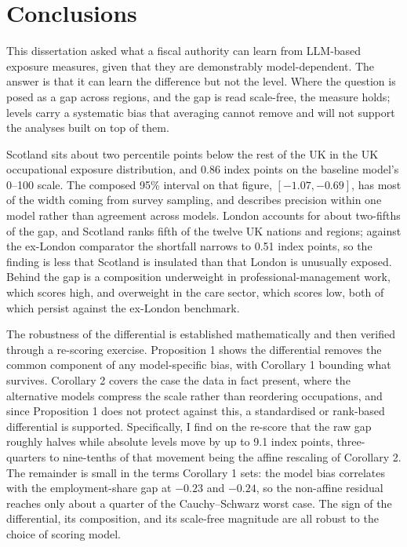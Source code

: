\section{Conclusions}\label{sec:conclusion}

This dissertation asked what a fiscal authority can learn from LLM-based exposure measures, given that they are demonstrably model-dependent. The answer is that it can learn the difference but not the level. Where the question is posed as a gap across regions, and the gap is read scale-free, the measure holds; levels carry a systematic bias that averaging cannot remove and will not support the analyses built on top of them.

Scotland sits about two percentile points below the rest of the UK in the UK occupational exposure distribution, and 0.86 index points on the baseline model's 0--100 scale. The composed 95\% interval on that figure, $[-1.07, -0.69]$, has most of the width coming from survey sampling, and describes precision within one model rather than agreement across models. London accounts for about two-fifths of the gap, and Scotland ranks fifth of the twelve UK nations and regions; against the ex-London comparator the shortfall narrows to 0.51 index points, so the finding is less that Scotland is insulated than that London is unusually exposed. Behind the gap is a composition underweight in professional-management work, which scores high, and overweight in the care sector, which scores low, both of which persist against the ex-London benchmark.

The robustness of the differential is established mathematically and then verified through a re-scoring exercise. Proposition 1 shows the differential removes the common component of any model-specific bias, with Corollary 1 bounding what survives. Corollary 2 covers the case the data in fact present, where the alternative models compress the scale rather than reordering occupations, and since Proposition 1 does not protect against this, a standardised or rank-based differential is supported. Specifically, I find on the re-score that the raw gap roughly halves while absolute levels move by up to 9.1 index points, three-quarters to nine-tenths of that movement being the affine rescaling of Corollary 2. The remainder is small in the terms Corollary 1 sets: the model bias correlates with the employment-share gap at $-0.23$ and $-0.24$, so the non-affine residual reaches only about a quarter of the Cauchy--Schwarz worst case. The sign of the differential, its composition, and its scale-free magnitude are all robust to the choice of scoring model.

